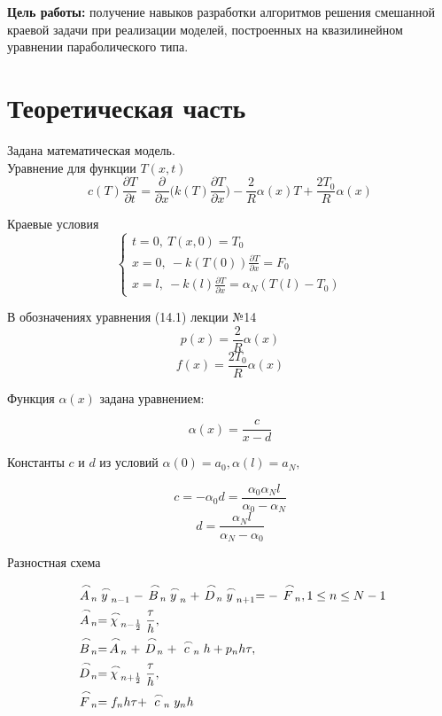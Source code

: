 \documentclass[a4paper, 14pt]{article}
\begin{document}
	\textbf{Цель работы:} получение навыков разработки  алгоритмов решения смешанной краевой задачи при реализации моделей, построенных на квазилинейном уравнении параболического типа. \\
	
	
	\section*{Теоретическая часть}
	
	Задана математическая модель.\\
	Уравнение для функции $T(x, t)$
	\begin{equation}
c(T)\frac{\partial T}{\partial t}=\frac{\partial}{\partial x}\bigg(k(T)\frac{\partial T}{\partial x}\bigg)-\frac{2}{R}\alpha(x)T+\frac{2T_0}{R}\alpha(x)
\end{equation}

Краевые условия
$$
 \begin{cases}
 t=0, ~T(x,0)=T_0
   \\
   x=0, ~-k(T(0))\frac{\partial T}{\partial x}=F_0
   \\
   x =l,~-k(l)\frac{\partial T}{\partial x}=\alpha_N(T(l)-T_0)
 \end{cases}
$$

В обозначениях уравнения (14.1) лекции №14
$$p(x)=\frac{2}{R}\alpha(x)$$
$$f(x)=\frac{2T_0}{R}\alpha(x)$$

Функция $\alpha(x)$ задана уравнением:

$$\alpha(x)=\frac{c}{x-d}$$

Константы $c$ и $d$  из условий $\alpha(0) = a_0, \alpha(l) = a_N, $

$$c=-\alpha_0d=\frac{\alpha_0\alpha_Nl}{\alpha_0-\alpha_N}$$
$$d = \frac{\alpha_Nl}{\alpha_N-\alpha_0}$$

Разностная схема

\begin{equation}
\begin{aligned}
&\buildrel\,\,\frown\over{A}_n\buildrel\,\,\frown\over{y}_{n-1}-\buildrel\,\,\frown\over{B}_n\buildrel\,\,\frown\over{y}_n+\buildrel\,\,\frown\over{D}_n\buildrel\,\,\frown\over{y}_{n+1}=-\buildrel\,\,\frown\over{F}_n, 1\le n\le N-1\\
&\buildrel\,\,\frown\over{A}_n=\buildrel\,\,\frown\over{\chi}_{n-\frac{1}{2}}\frac{\tau}{h},\\
&\buildrel\,\,\frown\over{B}_n=\buildrel\,\,\frown\over{A}_n+\buildrel\,\,\frown\over{D}_n+\buildrel\,\,\frown\over{c}_nh+p_nh\tau,\\
& \buildrel\,\,\frown\over{D}_n=\buildrel\,\,\frown\over{\chi}_{n+\frac{1}{2}}\frac{\tau}{h}, \\
&\buildrel\,\,\frown\over{F}_n=f_nh\tau+\buildrel\,\,\frown\over{c}_ny_nh\\
\end{aligned}
\end{equation}\\
\end{document}
